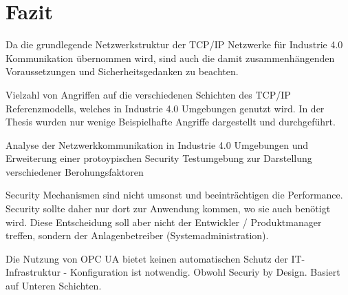 \chapter{Fazit}
Da die grundlegende Netzwerkstruktur der \ac{TCP}/\ac{IP} Netzwerke für Industrie 4.0 Kommunikation übernommen wird, sind auch die damit zusammenhängenden Voraussetzungen und Sicherheitsgedanken zu beachten. \cite{sichKom2017}

Vielzahl von Angriffen auf die verschiedenen Schichten des \ac{TCP}/\ac{IP} Referenzmodells, welches in Industrie 4.0 Umgebungen genutzt wird.
In der Thesis wurden nur wenige Beispielhafte Angriffe dargestellt und durchgeführt.

Analyse der Netzwerkkommunikation in Industrie 4.0 Umgebungen und Erweiterung einer protoypischen Security Testumgebung zur Darstellung verschiedener Berohungsfaktoren

Security Mechanismen sind nicht umsonst und beeinträchtigen die Performance. Security sollte daher nur dort zur Anwendung kommen, wo sie auch benötigt wird. Diese Entscheidung soll aber nicht der Entwickler / Produktmanager treffen, sondern der Anlagenbetreiber (Systemadministration).

Die Nutzung von \ac{OPC UA} bietet keinen automatischen Schutz der IT-Infrastruktur - Konfiguration ist notwendig. Obwohl Securiy by Design. Basiert auf Unteren Schichten.
